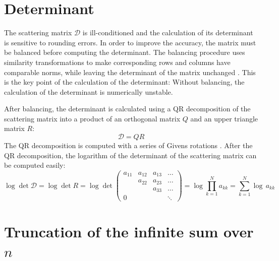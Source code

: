 \section{Determinant}

The scattering matrix $\mathcal{D}$ is ill-conditioned and the calculation of
its determinant is sensitive to rounding errors. In order to improve the
accuracy, the matrix must be balanced before computing the determinant. The
balancing procedure uses similarity transformations to make corresponding rows
and columns have comparable norms, while leaving the determinant of the matrix
unchanged \cite{NumericalRecipesInFortran, HandbookOfAutomaticComputation}.
This is the key point of the calculation of the determinant: Without balancing, the
calculation of the determinant is numerically unstable.

After balancing, the determinant is calculated using a QR decomposition of the scattering matrix
into a product of an orthogonal matrix $Q$ and an upper triangle matrix $R$:
\begin{equation}
\mathcal{D} = QR
\end{equation}
The QR decomposition is computed with a series of Givens rotations
\cite{MatrixComputations}. After the QR decomposition, the logarithm of the
determinant of the scattering matrix can be computed easily:
\begin{equation}
\log \det \mathcal{D} =
\log \det R = \log \det \left(
\begin{array}{cccc}
a_{11} & a_{12} & a_{13} & \dots \\
       & a_{22} & a_{23} & \dots \\
       &        & a_{33} & \dots \\
0      &        &        & \ddots
\end{array}
\right) = \log \prod_{k=1}^N a_{kk} = \sum_{k=1}^N \log \, a_{kk}
\end{equation}

\section{Truncation of the infinite sum over $n$}
\label{numerics_truncation_sumn}

